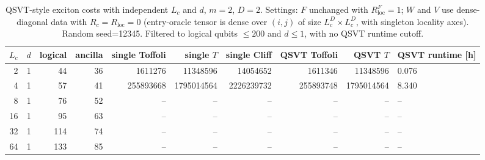 \begin{table}[t]
\centering
\scriptsize
\caption{QSVT-style exciton costs with independent $L_c$ and $d$, $m = 2$, $D = 2$. Settings: $F$ unchanged with $R_{\mathrm{loc}}^F = 1$; $W$ and $V$ use dense-diagonal data with $R_c = R_{\mathrm{loc}} = 0$ (entry-oracle tensor is dense over $(i, j)$ of size $L_c^D \times L_c^D$, with singleton locality axes). Random seed=12345. Filtered to logical qubits $\leq 200$ and $d \leq 1$, with no QSVT runtime cutoff.}
\begin{tabularx}{\linewidth}{rrrrrrrrr}
\toprule
$L_c$ & $d$ & logical & ancilla & single Toffoli & single $T$ & single Cliff & QSVT Toffoli & QSVT $T$ & QSVT runtime [h] \\
 & 1 & 44 & 36 & 1611276 & 11348596 & 14054652 & 1611346 & 11348596 & 0.076 \\
4 & 1 & 57 & 41 & 255893668 & 1795014564 & 2226239732 & 255893748 & 1795014564 & 8.340 \\
8 & 1 & 76 & 52 & -- & -- & -- & -- & -- & -- \\
16 & 1 & 95 & 63 & -- & -- & -- & -- & -- & -- \\
32 & 1 & 114 & 74 & -- & -- & -- & -- & -- & -- \\
64 & 1 & 133 & 85 & -- & -- & -- & -- & -- & -- \\
\bottomrule
\end{tabularx}
\end{table}
